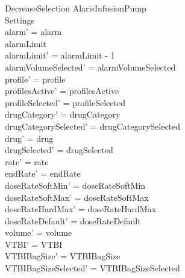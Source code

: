 \begin{schema}{DecreaseSelection}
	\Delta AlarisInfusionPump\\ 
	Settings\\
	\where
	alarm' = alarm\\
	alarmLimit \\
	alarmLimit' = alarmLimit - 1\\
	alarmVolumeSelected' = alarmVolumeSelected\\
	profile' = profile\\
	profilesActive' = profilesActive\\  
	  profileSelected' = profileSelected\\
	drugCategory' = drugCategory\\ drugCategorySelected' = drugCategorySelected\\
	drug' = drug\\ drugSelected' = drugSelected\\
	rate' = rate\\
	endRate' = endRate\\
	doseRateSoftMin' = doseRateSoftMin\\
	doseRateSoftMax' = doseRateSoftMax\\
	doseRateHardMax' = doseRateHardMax\\
	doseRateDefault' = doseRateDefault\\
	volume' = volume\\
	VTBI' = VTBI\\
	VTBIBagSize' = VTBIBagSize\\ VTBIBagSizeSelected' = VTBIBagSizeSelected\\

\end{schema}
